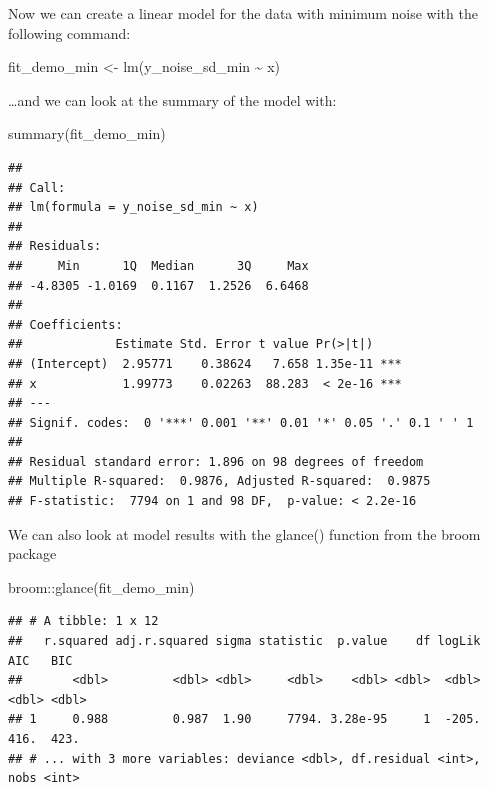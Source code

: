 \documentclass[
]{book}
\newenvironment{Shaded}{\begin{snugshade}}{\end{snugshade}}
\newcommand{\FunctionTok}[1]{\textcolor[rgb]{0.00,0.00,0.00}{#1}}
\newcommand{\NormalTok}[1]{#1}
\newcommand{\OtherTok}[1]{\textcolor[rgb]{0.56,0.35,0.01}{#1}}
\newcommand{\SpecialCharTok}[1]{\textcolor[rgb]{0.00,0.00,0.00}{#1}}
\begin{document}
Now we can create a linear model for the data with minimum noise with the following command:

\begin{Shaded}
\begin{Highlighting}[]
\NormalTok{fit\_demo\_min }\OtherTok{\textless{}{-}} \FunctionTok{lm}\NormalTok{(y\_noise\_sd\_min }\SpecialCharTok{\textasciitilde{}}\NormalTok{ x)}
\end{Highlighting}
\end{Shaded}

\ldots and we can look at the summary of the model with:

\begin{Shaded}
\begin{Highlighting}[]
\FunctionTok{summary}\NormalTok{(fit\_demo\_min)}
\end{Highlighting}
\end{Shaded}

\begin{verbatim}
## 
## Call:
## lm(formula = y_noise_sd_min ~ x)
## 
## Residuals:
##     Min      1Q  Median      3Q     Max 
## -4.8305 -1.0169  0.1167  1.2526  6.6468 
## 
## Coefficients:
##             Estimate Std. Error t value Pr(>|t|)    
## (Intercept)  2.95771    0.38624   7.658 1.35e-11 ***
## x            1.99773    0.02263  88.283  < 2e-16 ***
## ---
## Signif. codes:  0 '***' 0.001 '**' 0.01 '*' 0.05 '.' 0.1 ' ' 1
## 
## Residual standard error: 1.896 on 98 degrees of freedom
## Multiple R-squared:  0.9876, Adjusted R-squared:  0.9875 
## F-statistic:  7794 on 1 and 98 DF,  p-value: < 2.2e-16
\end{verbatim}

We can also look at model results with the glance() function from the broom package

\begin{Shaded}
\begin{Highlighting}[]
\NormalTok{broom}\SpecialCharTok{::}\FunctionTok{glance}\NormalTok{(fit\_demo\_min)}
\end{Highlighting}
\end{Shaded}

\begin{verbatim}
## # A tibble: 1 x 12
##   r.squared adj.r.squared sigma statistic  p.value    df logLik   AIC   BIC
##       <dbl>         <dbl> <dbl>     <dbl>    <dbl> <dbl>  <dbl> <dbl> <dbl>
## 1     0.988         0.987  1.90     7794. 3.28e-95     1  -205.  416.  423.
## # ... with 3 more variables: deviance <dbl>, df.residual <int>, nobs <int>
\end{verbatim}
\end{document}
